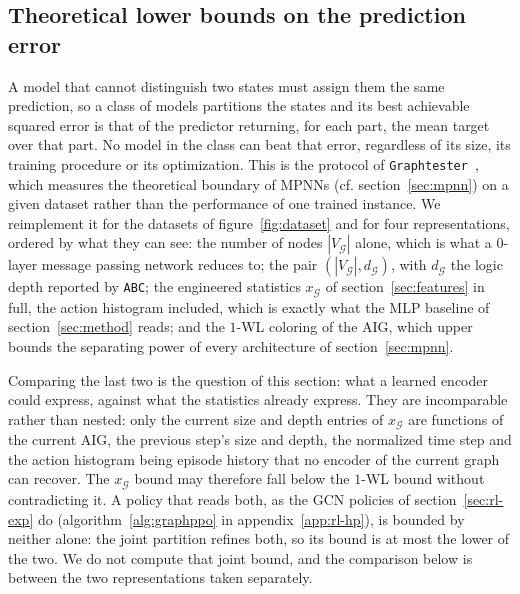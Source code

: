 \documentclass{article}
\begin{document}
\subsection{Theoretical lower bounds on the prediction error}\label{sec:bounds}
A model that cannot distinguish two states must assign them the same prediction, so a class of models partitions the states and its best achievable squared error is that of the predictor returning, for each part, the mean target over that part.
No model in the class can beat that error, regardless of its size, its training procedure or its optimization.
This is the protocol of \texttt{Graphtester}~\cite{graphtester}, which measures the theoretical boundary of MPNNs (cf. section~\ref{sec:mpnn}) on a given dataset rather than the performance of one trained instance.
We reimplement it for the datasets of figure~\ref{fig:dataset} and for four representations, ordered by what they can see: the number of nodes $|V_\mathcal{G}|$ alone, which is what a $0$-layer message passing network reduces to; the pair $(|V_\mathcal{G}|, d_\mathcal{G})$, with $d_\mathcal{G}$ the logic depth reported by \texttt{ABC}; the engineered statistics $x_\mathcal{G}$ of section~\ref{sec:features} in full, the action histogram included, which is exactly what the MLP baseline of section~\ref{sec:method} reads; and the $1$-WL coloring of the AIG, which upper bounds the separating power of every architecture of section~\ref{sec:mpnn}.

Comparing the last two is the question of this section: what a learned encoder could express, against what the statistics already express.
They are incomparable rather than nested: only the current size and depth entries of $x_\mathcal{G}$ are functions of the current AIG, the previous step's size and depth, the normalized time step and the action histogram being episode history that no encoder of the current graph can recover.
The $x_\mathcal{G}$ bound may therefore fall below the $1$-WL bound without contradicting it.
A policy that reads both, as the GCN policies of section~\ref{sec:rl-exp} do (algorithm~\ref{alg:graphppo} in appendix~\ref{app:rl-hp}), is bounded by neither alone: the joint partition refines both, so its bound is at most the lower of the two.
We do not compute that joint bound, and the comparison below is between the two representations taken separately.
\end{document}
